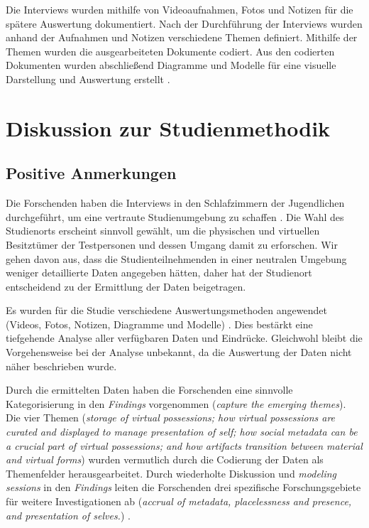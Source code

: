 \documentclass{hsflensburg}
\begin{document}
	Die Interviews wurden mithilfe von Videoaufnahmen, Fotos und Notizen für die spätere Auswertung dokumentiert. Nach der Durchführung
	der Interviews wurden anhand der Aufnahmen und Notizen verschiedene Themen
	definiert. Mithilfe der Themen wurden die ausgearbeiteten
	Dokumente codiert. Aus den codierten Dokumenten wurden abschließend Diagramme und Modelle für eine visuelle Darstellung und Auswertung erstellt  \cite{odom2011teenagers}. 

	\section{Diskussion zur Studienmethodik}

	\subsection{Positive Anmerkungen}

	Die Forschenden haben die Interviews in den Schlafzimmern der Jugendlichen durchgeführt, um eine vertraute Studienumgebung zu schaffen \cite{odom2011teenagers}. Die Wahl des Studienorts erscheint sinnvoll gewählt, um die physischen und virtuellen Besitztümer der Testpersonen und dessen Umgang damit zu erforschen. Wir gehen davon aus, dass die Studienteilnehmenden in einer neutralen Umgebung weniger detaillierte Daten angegeben hätten, daher hat der Studienort entscheidend zu der Ermittlung der Daten beigetragen.

	Es wurden für die Studie verschiedene Auswertungsmethoden angewendet (Videos, Fotos, Notizen, Diagramme und Modelle) \cite{odom2011teenagers}. Dies bestärkt eine tiefgehende Analyse aller verfügbaren Daten und Eindrücke. Gleichwohl bleibt die Vorgehensweise bei der Analyse unbekannt, da die Auswertung der Daten nicht näher beschrieben wurde.   

	Durch die ermittelten Daten haben die Forschenden eine sinnvolle Kategorisierung in den \textit{Findings} vorgenommen (\textit{capture the emerging themes}). Die vier Themen (\textit{storage of virtual possessions; how virtual possessions are curated and displayed to manage presentation of self; how social metadata can be a crucial part of virtual possessions; and how artifacts transition between material and virtual forms}) wurden vermutlich durch die Codierung der Daten als Themenfelder herausgearbeitet. Durch wiederholte Diskussion und \textit{modeling sessions} in den \textit{Findings} leiten die Forschenden drei spezifische Forschungsgebiete für weitere Investigationen ab (\textit{accrual of metadata, placelessness and presence, and presentation of selves.})  \cite{odom2011teenagers}.   
\end{document}
